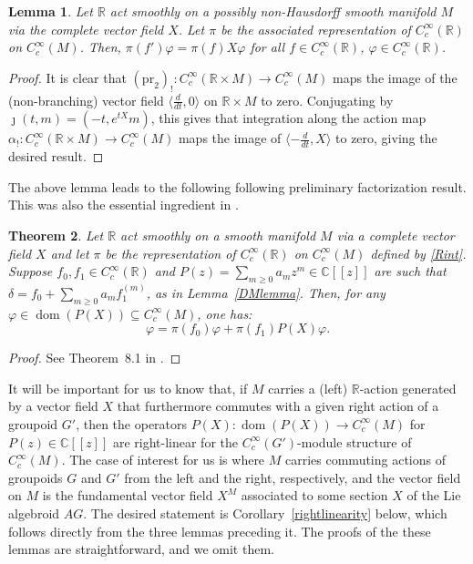 \documentclass[12pt]{article}
\theoremstyle{plain}
\newtheorem{thm}{Theorem}[section]
\newtheorem{lemma}[thm]{Lemma}
\theoremstyle{definition}
\newcommand{\R}{\mathbb{R}}
\newcommand{\C}{\mathbb{C}}
\newcommand{\dom}{\operatorname{dom}}
\numberwithin{equation}{section}
\begin{document}
\begin{lemma}
Let $\R$ act smoothly on a possibly non-Hausdorff smooth manifold $M$ via the complete vector field $X$. Let $\pi$ be the associated representation of $C_c^\infty(\R)$ on $C_c^\infty(M)$.  Then, $\pi(f')\varphi = \pi(f)X\varphi$ for all $f \in C_c^\infty(\R)$, $\varphi \in C_c^\infty(\R)$.
\end{lemma}
\begin{proof}
It is clear that $(\mathrm{pr}_2)_!:C_c^\infty(\R \times M) \to C_c^\infty(M)$ maps the image of the (non-branching) vector field $\langle \frac{d}{dt} , 0 \rangle$ on $\R \times M$ to zero. Conjugating by $\jmath(t,m)=(-t,e^{tX}m)$, this gives that integration along the action map $\alpha_!  :C_c^\infty(\R \times M) \to C_c^\infty(M)$ maps the image of $\langle -\frac{d}{dt},X \rangle$ to zero, giving the desired result.
\end{proof}
The above lemma leads to the following following preliminary factorization  result. This was  also the essential ingredient in \cite{Francis[DM]}.
\begin{thm}\label{prelimfac}
Let $\R$ act  smoothly on a smooth manifold $M$ via a complete vector field $X$ and let $\pi$ be the representation of $C_c^\infty(\R)$ on $C_c^\infty(M)$ defined by \eqref{Rint}. Suppose $f_0,f_1 \in C_c^\infty(\R)$ and $P(z) = \sum_{m \geq 0} a_m z^m \in \C[[z]]$ are such that $\delta = f_0+\sum_{m \geq 0}a_m f_1^{(m)}$, as in Lemma~\ref{DMlemma}.
Then, for any $\varphi \in \dom(P(X)) \subseteq C_c^\infty(M)$, one has:
\[
\varphi = \pi(f_0)\varphi+ \pi(f_1) P(X) \varphi.
\]
\end{thm}
\begin{proof}
See Theorem~8.1  in \cite{Francis[DM]}.
\end{proof}








It will be important for us to know that, if $M$ carries a (left) $\R$-action generated by a vector field $X$ that furthermore commutes with a given right action of a groupoid $G'$, then the operators $P(X) : \dom(P(X))\to C_c^\infty(M)$ for $P(z) \in \C[[z]]$ are right-linear for the $C_c^\infty(G')$-module structure of $C_c^\infty(M)$.  The case of interest for us is where $M$ carries commuting actions of groupoids $G$ and $G'$ from the left and the right, respectively, and the vector field on $M$ is the fundamental vector field $X^M$  associated to some section $X$ of the Lie algebroid $AG$. The desired statement is Corollary~\ref{rightlinearity} below, which follows directly from the three lemmas preceding it. The proofs of the these lemmas are straightforward, and we omit them.
\end{document}
